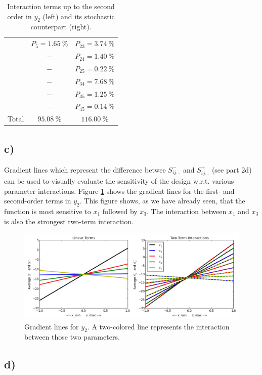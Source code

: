 \begin{table}[h!]
\begin{tabular}{c|cc}
		      & $P_{5} = 1.65\ \%$  & $P_{23} = 3.74\ \%$  \\
		      &         $-$         & $P_{24} = 1.40\ \%$  \\
		      &         $-$         & $P_{25} = 0.22\ \%$  \\
		      &         $-$         & $P_{34} = 7.68\ \%$  \\
		      &         $-$         & $P_{35} = 1.25\ \%$  \\
		      &         $-$         & $P_{45} = 0.14\ \%$  \\ \hline
		Total &     $95.08\ \%$     &     $116.00\ \%$
	\end{tabular}
	\caption{Interaction terms up to the second order in $y_2$ (left) and its stochastic counterpart (right).}
	\label{tab:interaction_y2andknuckles}
\end{table}

\subsection*{c)}

Gradient lines which represent the difference betwee $S_{ij\dots}^-$ and $S_{ij\dots}^+$ (see part 2d) can be used to visually evaluate the sensitivity of the design w.r.t. various parameter interactions. Figure \ref{fig:gradient_lines} shows the gradient lines for the first- and second-order terms in $y_2$. This figure shows, as we have already seen, that the function is most sensitive to $x_1$ followed by $x_3$. The interaction between $x_1$ and $x_3$ is also the strongest two-term interaction.

\begin{figure}[h!]
	\centering
	\includegraphics[width=\textwidth]{figures/gradient_lines.png}
	\caption{Gradient lines for $y_2$. A two-colored line represents the interaction between those two parameters.}
	\label{fig:gradient_lines}
\end{figure}

\subsection*{d)}

